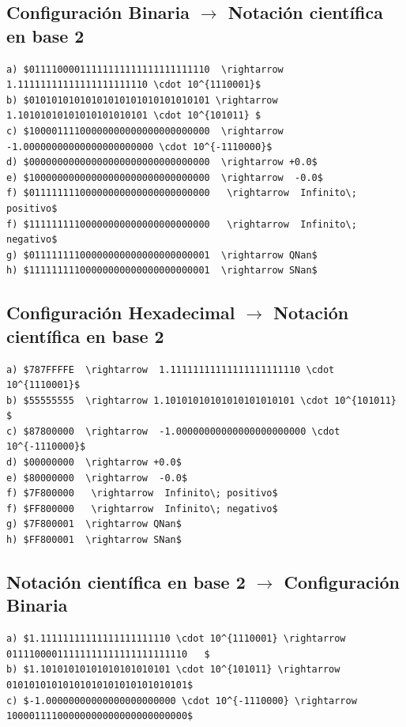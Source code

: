 \documentclass{article}
\begin{document}
\subsection{Configuración Binaria $\rightarrow$ Notación científica en base 2}
\begin{lstlisting}[mathescape]
a) $01111000011111111111111111111110  \rightarrow  1.11111111111111111111110 \cdot 10^{1110001}$
b) $01010101010101010101010101010101 \rightarrow 1.10101010101010101010101 \cdot 10^{101011} $
c) $10000111100000000000000000000000  \rightarrow  -1.00000000000000000000000 \cdot 10^{-1110000}$
d) $00000000000000000000000000000000  \rightarrow +0.0$
e) $10000000000000000000000000000000  \rightarrow  -0.0$
f) $01111111100000000000000000000000   \rightarrow  Infinito\; positivo$
f) $11111111100000000000000000000000   \rightarrow  Infinito\; negativo$
g) $01111111100000000000000000000001  \rightarrow QNan$
h) $11111111100000000000000000000001  \rightarrow SNan$
\end{lstlisting}

\subsection{Configuración Hexadecimal $\rightarrow$ Notación científica en base 2}
\begin{lstlisting}[mathescape]
a) $787FFFFE  \rightarrow  1.11111111111111111111110 \cdot 10^{1110001}$
b) $55555555  \rightarrow 1.10101010101010101010101 \cdot 10^{101011} $
c) $87800000  \rightarrow  -1.00000000000000000000000 \cdot 10^{-1110000}$
d) $00000000  \rightarrow +0.0$
e) $80000000  \rightarrow  -0.0$
f) $7F800000   \rightarrow  Infinito\; positivo$
f) $FF800000   \rightarrow  Infinito\; negativo$
g) $7F800001  \rightarrow QNan$
h) $FF800001  \rightarrow SNan$
\end{lstlisting}

\subsection{Notación científica en base 2 $\rightarrow$ Configuración Binaria}
\begin{lstlisting}[mathescape]
a) $1.11111111111111111111110 \cdot 10^{1110001} \rightarrow 01111000011111111111111111111110   $
b) $1.10101010101010101010101 \cdot 10^{101011} \rightarrow 01010101010101010101010101010101$
c) $-1.00000000000000000000000 \cdot 10^{-1110000} \rightarrow 10000111100000000000000000000000$
\end{lstlisting}
\end{document}
